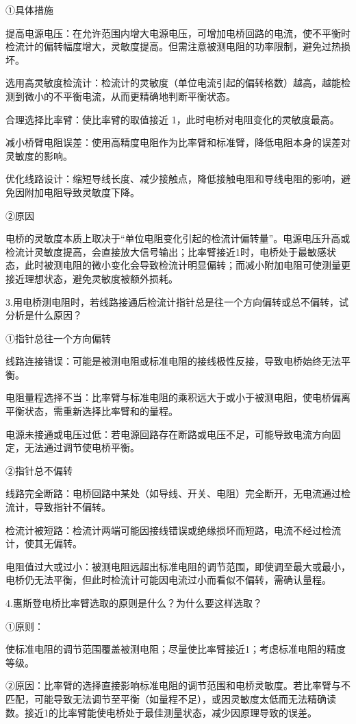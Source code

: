 \documentclass[10pt,a4paper]{ctexart}
\begin{document}
①具体措施

提高电源电压：在允许范围内增大电源电压，可增加电桥回路的电流，使不平衡时检流计的偏转幅度增大，灵敏度提高。但需注意被测电阻的功率限制，避免过热损坏。

选用高灵敏度检流计：检流计的灵敏度（单位电流引起的偏转格数）越高，越能检测到微小的不平衡电流，从而更精确地判断平衡状态。

合理选择比率臂：使比率臂的取值接近 1，此时电桥对电阻变化的灵敏度最高。

减小桥臂电阻误差：使用高精度电阻作为比率臂和标准臂，降低电阻本身的误差对灵敏度的影响。

优化线路设计：缩短导线长度、减少接触点，降低接触电阻和导线电阻的影响，避免因附加电阻导致灵敏度下降。

②原因

电桥的灵敏度本质上取决于“单位电阻变化引起的检流计偏转量”。电源电压升高或检流计灵敏度提高，会直接放大信号输出；比率臂接近1时，电桥处于最敏感状态，此时被测电阻的微小变化会导致检流计明显偏转；而减小附加电阻可使测量更接近理想状态，避免灵敏度被额外损耗。

3.用电桥测电阻时，若线路接通后检流计指针总是往一个方向偏转或总不偏转，试分析是什么原因？

①指针总往一个方向偏转

线路连接错误：可能是被测电阻或标准电阻的接线极性反接，导致电桥始终无法平衡。

电阻量程选择不当：比率臂与标准电阻的乘积远大于或小于被测电阻，使电桥偏离平衡状态，需重新选择比率臂和的量程。

电源未接通或电压过低：若电源回路存在断路或电压不足，可能导致电流方向固定，无法通过调节使电桥平衡。

②指针总不偏转

线路完全断路：电桥回路中某处（如导线、开关、电阻）完全断开，无电流通过检流计，导致指针不偏转。

检流计被短路：检流计两端可能因接线错误或绝缘损坏而短路，电流不经过检流计，使其无偏转。

电阻值过大或过小：被测电阻远超出标准电阻的调节范围，即使调至最大或最小，电桥仍无法平衡，但此时检流计可能因电流过小而看似不偏转，需确认量程。

4.惠斯登电桥比率臂选取的原则是什么？为什么要这样选取？

①原则：

使标准电阻的调节范围覆盖被测电阻；尽量使比率臂接近1；考虑标准电阻的精度等级。

②原因：比率臂的选择直接影响标准电阻的调节范围和电桥灵敏度。若比率臂与不匹配，可能导致无法调节至平衡（如量程不足），或因灵敏度太低而无法精确读数。接近1的比率臂能使电桥处于最佳测量状态，减少因原理导致的误差。
\end{document}
